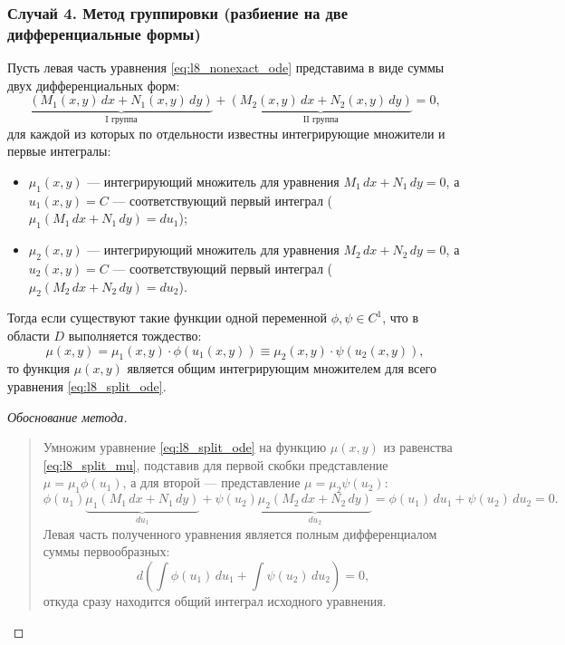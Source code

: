 \subsubsection{Случай 4. Метод группировки (разбиение на две дифференциальные формы)}

\begin{proposition}
    Пусть левая часть уравнения \eqref{eq:l8_nonexact_ode} представима в виде
    суммы двух дифференциальных форм:
    \begin{equation} \label{eq:l8_split_ode}
        \underbrace{\left(M_1(x, y) \, dx + N_1(x, y) \, dy\right)}_{\text{I группа}}
        + \underbrace{\left(M_2(x, y) \, dx + N_2(x, y) \, dy\right)}_{\text{II группа}}
        = 0, \tag{15}
    \end{equation}
    для каждой из которых по отдельности известны интегрирующие множители и
    первые интегралы:
    \begin{itemize}
        \item $\mu_1(x, y)$ — интегрирующий множитель для уравнения
        $M_1 \, dx + N_1 \, dy = 0$, а $u_1(x, y) = C$ — соответствующий
        первый интеграл ($\mu_1(M_1 \, dx + N_1 \, dy) = du_1$);
        \item $\mu_2(x, y)$ — интегрирующий множитель для уравнения
        $M_2 \, dx + N_2 \, dy = 0$, а $u_2(x, y) = C$ — соответствующий
        первый интеграл ($\mu_2(M_2 \, dx + N_2 \, dy) = du_2$).
    \end{itemize}
    Тогда если существуют такие функции одной переменной $\phi, \psi \in C^1$,
    что в области $D$ выполняется тождество:
    \begin{equation} \label{eq:l8_split_mu}
        \mu(x, y) = \mu_1(x, y) \cdot \phi\left(u_1(x, y)\right) \equiv
        \mu_2(x, y) \cdot \psi\left(u_2(x, y)\right), \tag{16}
    \end{equation}
    то функция $\mu(x, y)$ является общим интегрирующим множителем для всего
    уравнения \eqref{eq:l8_split_ode}.
\end{proposition}

\begin{proof}[Обоснование метода]~\\
    \begin{quote}
        Умножим уравнение \eqref{eq:l8_split_ode} на функцию $\mu(x, y)$ из
        равенства \eqref{eq:l8_split_mu}, подставив для первой скобки
        представление $\mu = \mu_1 \phi(u_1)$, а для второй — представление
        $\mu = \mu_2 \psi(u_2)$:
        \[
            \phi(u_1) \underbrace{\mu_1 \left(M_1 \, dx + N_1 \, dy\right)}_{du_1}
            + \psi(u_2) \underbrace{\mu_2 \left(M_2 \, dx + N_2 \, dy\right)}_{du_2}
            = \phi(u_1) \, du_1 + \psi(u_2) \, du_2 = 0.
        \]
        Левая часть полученного уравнения является полным дифференциалом суммы
        первообразных:
        \[
            d\left(\int \phi(u_1) \, du_1 + \int \psi(u_2) \, du_2\right) = 0,
        \]
        откуда сразу находится общий интеграл исходного уравнения.
    \end{quote}
\end{proof}

